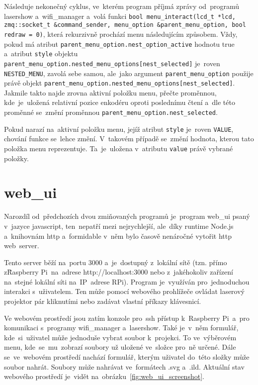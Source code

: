         Následuje nekonečný cyklus, ve~kterém program příjmá zprávy od~programů lasershow a~wifi\_manager a~volá funkci \texttt{bool menu_interact(lcd_t *lcd, zmq::socket_t &command_sender, menu_option &parent_menu_option, bool redraw = 0)}, která rekurzivně prochází menu následujícím způsobem.
Vždy, pokud má atribut \texttt{parent_menu_option.nest_option_active} hodnotu true a~atribut \texttt{style} objektu \texttt{parent_menu_option.nested_menu_options[nest_selected]} je~roven \texttt{NESTED_MENU}, zavolá sebe samou, ale~jako argument \texttt{parent_menu_option} použije právě objekt \texttt{parent_menu_option.nested_menu_options[nest_selected]}.
Jakmile takto najde zrovna aktivní položku menu, přečte proměnnou, kde~je~uložená relativní pozice enkodéru oproti poslednímu čtení a~dle této proměnné se~změní proměnnou \texttt{parent_menu_option.nest_selected}.

Pokud narazí na~aktivní položku menu, jejíž atribut \texttt{style} je~roven \texttt{VALUE}, chování funkce se~lehce změní. V~takovém případě se~změní hodnota, kterou tato položka menu reprezentuje. Ta~je~uložena v~atributu \texttt{value} právě vybrané položky.

\section{web\_ui}

Narozdíl od~předchozích dvou zmiňovaných programů je~program web\_ui psaný v~jazyce javascript, ten~nepatří mezi nejrychlejší, ale~díky runtime Node.js a~knihovnám http a~formidable v~něm bylo časově nenáročné vytořit http web~server.

Tento server běží na~portu 3000 a~je~dostupný z~lokální sítě (tzn. přímo z\~Raspberry Pi~na~adrese http://localhost:3000 nebo z~jakéhokoliv zařízení na~stejné lokální síti na~IP~adrese RPi).
Program je~využíván pro~jednoduchou interakci s~uživatelem.
Ten může pomocí webového prohlížeče ovládat laserový projektor pár kliknutími nebo zadávat vlastní příkazy klávesnicí.

Ve webovém prostředí jsou zatím konzole pro~ssh přístup k~Raspberry Pi~a~pro komunikaci s~programy wifi\_manager a~lasershow.
Také je~v~něm formulář, kde~si~uživatel může jednoduše vybrat soubor k~projekci.
To ve~výběrovém menu, kde~se~mu~zobrazí soubory už uložené ve~složce pro~ně určené. Dále se~ve~webovém prostředí nachází formulář, kterým uživatel do~této složky může soubor nahrát. Soubory může nahrávat ve~formátech .svg a~.ild.
Aktuální stav webového prostředí je~vidět na~obrázku~\ref{fig:web_ui_screenshot}.

